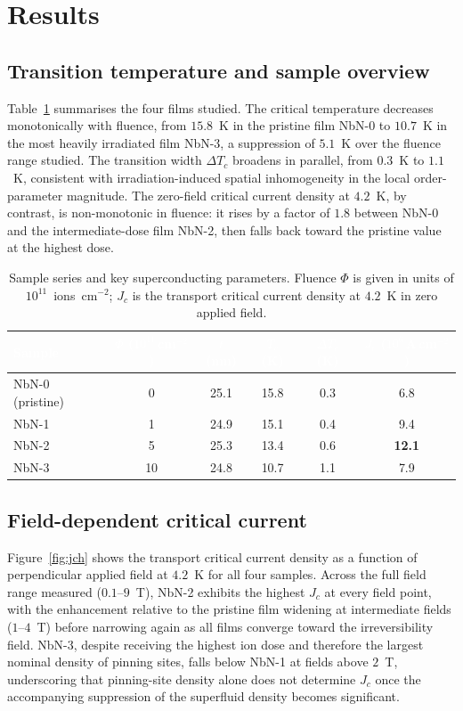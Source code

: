 \section{Results}
\label{sec:results}

\subsection{Transition temperature and sample overview}
Table~\ref{tab:samples} summarises the four films studied. The critical temperature decreases monotonically with fluence, from $15.8$~K in the pristine film NbN-0 to $10.7$~K in the most heavily irradiated film NbN-3, a suppression of $5.1$~K over the fluence range studied. The transition width $\Delta T_c$ broadens in parallel, from $0.3$~K to $1.1$~K, consistent with irradiation-induced spatial inhomogeneity in the local order-parameter magnitude. The zero-field critical current density at $4.2$~K, by contrast, is non-monotonic in fluence: it rises by a factor of $1.8$ between NbN-0 and the intermediate-dose film NbN-2, then falls back toward the pristine value at the highest dose.

\begin{table}[!h]
\centering
\caption{Sample series and key superconducting parameters. Fluence $\Phi$ is given in units of $10^{11}$~ions~cm$^{-2}$; $J_c$ is the transport critical current density at $4.2$~K in zero applied field.}
\label{tab:samples}
\begin{tabular}{lccccc}
\toprule
\rowcolor{iopBlue}
\textcolor{white}{\textbf{Sample}} & \textcolor{white}{\boldmath$\Phi$ ($10^{11}$\,cm$^{-2}$)} & \textcolor{white}{\textbf{$t$ (nm)}} & \textcolor{white}{\textbf{$T_c$ (K)}} & \textcolor{white}{\boldmath$\Delta T_c$ (K)} & \textcolor{white}{\boldmath$J_c$ ($10^{6}$\,A\,cm$^{-2}$)} \\
\midrule
NbN-0 (pristine) & 0 & 25.1 & 15.8 & 0.3 & 6.8 \\
NbN-1 & 1 & 24.9 & 15.1 & 0.4 & 9.4 \\
\rowcolor{iopLight}
NbN-2 & 5 & 25.3 & 13.4 & 0.6 & \textbf{12.1} \\
NbN-3 & 10 & 24.8 & 10.7 & 1.1 & 7.9 \\
\bottomrule
\end{tabular}
\end{table}

\subsection{Field-dependent critical current}
Figure~\ref{fig:jch} shows the transport critical current density as a function of perpendicular applied field at $4.2$~K for all four samples. Across the full field range measured ($0.1$--$9$~T), NbN-2 exhibits the highest $J_c$ at every field point, with the enhancement relative to the pristine film widening at intermediate fields ($1$--$4$~T) before narrowing again as all films converge toward the irreversibility field. NbN-3, despite receiving the highest ion dose and therefore the largest nominal density of pinning sites, falls below NbN-1 at fields above $2$~T, underscoring that pinning-site density alone does not determine $J_c$ once the accompanying suppression of the superfluid density becomes significant.

